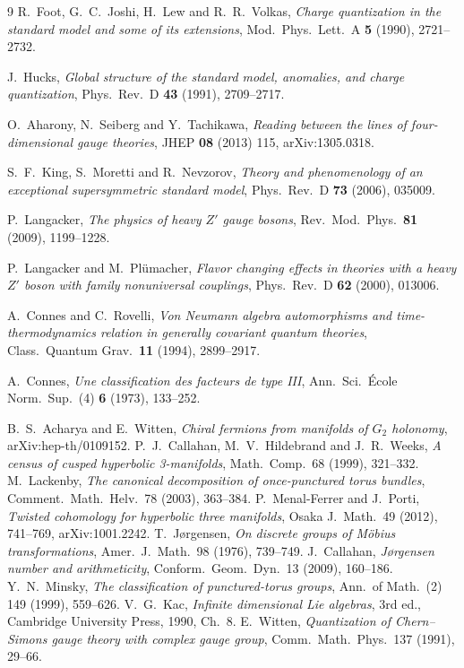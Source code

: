 \documentclass[11pt,a4paper]{article}
\theoremstyle{definition}
\theoremstyle{remark}
\begin{document}
\begin{thebibliography}{9}
 R.~Foot, G.~C.~Joshi, H.~Lew and R.~R.~Volkas, \emph{Charge quantization in the standard model and some of
its extensions}, Mod.\ Phys.\ Lett.\ A \textbf{5} (1990), 2721--2732.

 J.~Hucks, \emph{Global structure of the standard model, anomalies, and charge quantization}, Phys.\ Rev.\ D
\textbf{43} (1991), 2709--2717.

 O.~Aharony, N.~Seiberg and Y.~Tachikawa, \emph{Reading between the lines of four-dimensional gauge theories},
JHEP \textbf{08} (2013) 115, arXiv:1305.0318.

 S.~F.~King, S.~Moretti and R.~Nevzorov, \emph{Theory and phenomenology of an exceptional supersymmetric
standard model}, Phys.\ Rev.\ D \textbf{73} (2006), 035009.

 P.~Langacker, \emph{The physics of heavy $Z'$ gauge bosons}, Rev.\ Mod.\ Phys.\ \textbf{81} (2009), 1199--1228.

 P.~Langacker and M.~Pl\"umacher, \emph{Flavor changing effects in theories with a heavy $Z'$ boson with family
nonuniversal couplings}, Phys.\ Rev.\ D \textbf{62} (2000), 013006.

 A.~Connes and C.~Rovelli, \emph{Von Neumann algebra automorphisms and time-thermodynamics relation in generally
covariant quantum theories}, Class.\ Quantum Grav.\ \textbf{11} (1994), 2899--2917.

 A.~Connes, \emph{Une classification des facteurs de type III}, Ann.\ Sci.\ \'Ecole Norm.\ Sup.\ (4)
\textbf{6} (1973), 133--252.

 B.~S.~Acharya and E.~Witten, \emph{Chiral fermions from manifolds of $G_2$ holonomy}, arXiv:hep-th/0109152.
 P.~J.~Callahan, M.~V.~Hildebrand and J.~R.~Weeks, \emph{A census of cusped hyperbolic 3-manifolds}, Math.\ Comp.\ 68 (1999), 321--332.
 M.~Lackenby, \emph{The canonical decomposition of once-punctured torus bundles}, Comment.\ Math.\ Helv.\ 78 (2003), 363--384.
 P.~Menal-Ferrer and J.~Porti, \emph{Twisted cohomology for hyperbolic three manifolds}, Osaka J.\ Math.\ 49 (2012), 741--769, arXiv:1001.2242.
 T.~J\o rgensen, \emph{On discrete groups of M\"obius transformations}, Amer.\ J.\ Math.\ 98 (1976), 739--749.
 J.~Callahan, \emph{J\o rgensen number and arithmeticity}, Conform.\ Geom.\ Dyn.\ 13 (2009), 160--186.
 Y.~N.~Minsky, \emph{The classification of punctured-torus groups}, Ann.\ of Math.\ (2) 149 (1999), 559--626.
 V.~G.~Kac, \emph{Infinite dimensional Lie algebras}, 3rd ed., Cambridge University Press, 1990, Ch.~8.
 E.~Witten, \emph{Quantization of Chern--Simons gauge theory with complex gauge group}, Comm.\ Math.\ Phys.\ 137 (1991), 29--66.


\end{thebibliography}
\end{document}
